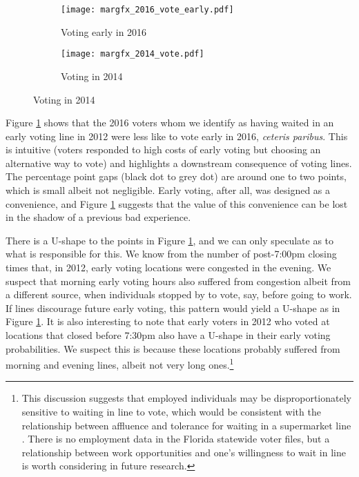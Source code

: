 \documentclass[12pt,titlepage]{article}
\begin{document}
\begin{figure}[!ht]
\caption{The effect of waiting in line to vote in 2012 on voting early in 2016 and voting 2014}
\begin{subfigure}{.5\textwidth}
    \centering\texttt{[image: margfx\_2016\_vote\_early.pdf]}
    \caption{Voting early in 2016}
     \label{fig:atevotingearly2016}
 \end{subfigure}
 \begin{subfigure}{.5\textwidth}
 \centering\texttt{[image: margfx\_2014\_vote.pdf]}
 \caption{Voting in 2014}
  \label{fig:prvoting2014}
\end{subfigure}
\end{figure}

Figure \ref{fig:atevotingearly2016} shows that the 2016 voters whom we
identify as having waited in an early voting line in 2012 were less
like to vote early in 2016, \emph{ceteris paribus}.  This is intuitive
(voters responded to high costs of early voting but choosing an
alternative way to vote) and highlights a downstream consequence of
voting lines.  The percentage point gaps (black dot to grey dot) are
around one to two points, which is small albeit not negligible.  Early
voting, after all, was designed as a convenience, and Figure
\ref{fig:atevotingearly2016} suggests that the value of this
convenience can be lost in the shadow of a previous bad experience.

There is a U-shape to the points in Figure
\ref{fig:atevotingearly2016}, and we can only speculate as to what is
responsible for this.  We know from the number of post-7:00pm closing
times that, in 2012, early voting locations were congested in the
evening.  We suspect that morning early voting hours also suffered
from congestion albeit from a different source, when individuals
stopped by to vote, say, before going to work.  If lines discourage
future early voting, this pattern would yield a U-shape as in Figure
\ref{fig:atevotingearly2016}.  It is also interesting to note that
early voters in 2012 who voted at locations that closed before 7:30pm
also have a U-shape in their early voting probabilities.  We suspect
this is because these locations probably suffered from morning and
evening lines, albeit not very long ones.\footnote{This discussion
  suggests that employed individuals may be disproportionately
  sensitive to waiting in line to vote, which would be consistent with
  the relationship between affluence and tolerance for waiting in a
  supermarket line \citep[e.g.,][]{bennett:waitinginlinechars}.  There
  is no employment data in the Florida statewide voter files, but a
  relationship between work opportunities and one's willingness to
  wait in line is worth considering in future research.}
\end{document}
